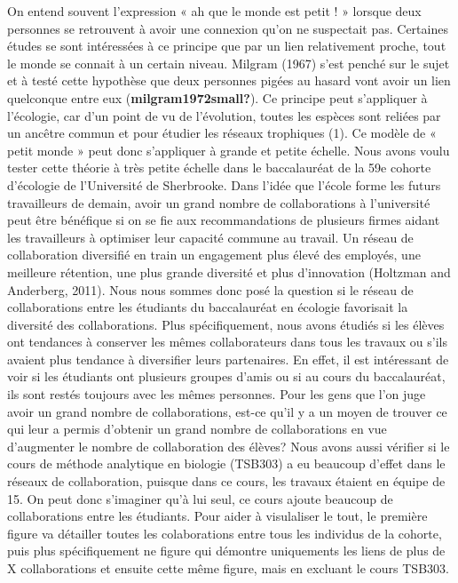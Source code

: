 \documentclass[9pt,twocolumn,twoside,]{pnas-new}
\begin{document}
On entend souvent l'expression « ah que le monde est petit ! » lorsque
deux personnes se retrouvent à avoir une connexion qu'on ne suspectait
pas. Certaines études se sont intéressées à ce principe que par un lien
relativement proche, tout le monde se connait à un certain niveau.
Milgram (1967) s'est penché sur le sujet et à testé cette hypothèse que
deux personnes pigées au hasard vont avoir un lien quelconque entre eux
(\textbf{milgram1972small?}). Ce principe peut s'appliquer à l'écologie,
car d'un point de vu de l'évolution, toutes les espèces sont reliées par
un ancêtre commun et pour étudier les réseaux trophiques (1). Ce modèle
de « petit monde » peut donc s'appliquer à grande et petite échelle.
Nous avons voulu tester cette théorie à très petite échelle dans le
baccalauréat de la 59e cohorte d'écologie de l'Université de Sherbrooke.
Dans l'idée que l'école forme les futurs travailleurs de demain, avoir
un grand nombre de collaborations à l'université peut être bénéfique si
on se fie aux recommandations de plusieurs firmes aidant les
travailleurs à optimiser leur capacité commune au travail. Un réseau de
collaboration diversifié en train un engagement plus élevé des employés,
une meilleure rétention, une plus grande diversité et plus d'innovation
(Holtzman and Anderberg, 2011). Nous nous sommes donc posé la question
si le réseau de collaborations entre les étudiants du baccalauréat en
écologie favorisait la diversité des collaborations. Plus
spécifiquement, nous avons étudiés si les élèves ont tendances à
conserver les mêmes collaborateurs dans tous les travaux ou s'ils
avaient plus tendance à diversifier leurs partenaires. En effet, il est
intéressant de voir si les étudiants ont plusieurs groupes d'amis ou si
au cours du baccalauréat, ils sont restés toujours avec les mêmes
personnes. Pour les gens que l'on juge avoir un grand nombre de
collaborations, est-ce qu'il y a un moyen de trouver ce qui leur a
permis d'obtenir un grand nombre de collaborations en vue d'augmenter le
nombre de collaboration des élèves? Nous avons aussi vérifier si le
cours de méthode analytique en biologie (TSB303) a eu beaucoup d'effet
dans le réseaux de collaboration, puisque dans ce cours, les travaux
étaient en équipe de 15. On peut donc s'imaginer qu'à lui seul, ce cours
ajoute beaucoup de collaborations entre les étudiants. Pour aider à
visulaliser le tout, le première figure va détailler toutes les
colaborations entre tous les individus de la cohorte, puis plus
spécifiquement ne figure qui démontre uniquements les liens de plus de X
collaborations et ensuite cette même figure, mais en excluant le cours
TSB303.
\end{document}
